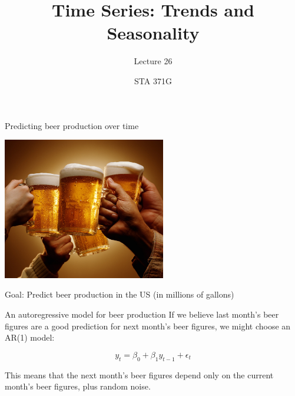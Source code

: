 \documentclass{beamer}\usepackage[]{graphicx}\usepackage[]{color}
\title{Time Series: Trends and Seasonality}
\subtitle{Lecture 26}
\author{STA 371G}
\begin{document}
  
  

  \frame{\maketitle}



  \begin{darkframes}


    \begin{frame}{Predicting beer production over time}
    \begin{center}
        \includegraphics[width=2.8in]{beer} \\
      \end{center}
      Goal: Predict beer production in the US (in millions of gallons)
      \lc
      \end{frame}
\begin{frame}[fragile]{An autoregressive model for beer production}
    If we believe last month's beer figures are a good prediction for next month's beer figures, we might choose an AR(1) model:

    $$y_t = \beta_0 + \beta_1 y_{t-1} + \epsilon_t$$

    This means that the next month's beer figures depend only on the current month's beer figures, plus random noise.

   \bigskip


\end{frame}
\end{darkframes}
\end{document}
